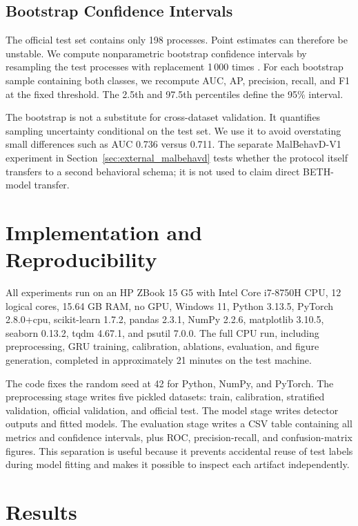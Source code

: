 \documentclass[10pt,journal,compsoc]{IEEEtran}
\begin{document}
\subsection{Bootstrap Confidence Intervals}

The official test set contains only 198 processes. Point estimates can therefore be unstable. We compute nonparametric bootstrap confidence intervals by resampling the test processes with replacement 1\,000 times \cite{efron1994}. For each bootstrap sample containing both classes, we recompute AUC, AP, precision, recall, and F1 at the fixed threshold. The 2.5th and 97.5th percentiles define the 95\% interval.

The bootstrap is not a substitute for cross-dataset validation. It quantifies sampling uncertainty conditional on the test set. We use it to avoid overstating small differences such as AUC 0.736 versus 0.711. The separate MalBehavD-V1 experiment in Section~\ref{sec:external_malbehavd} tests whether the protocol itself transfers to a second behavioral schema; it is not used to claim direct BETH-model transfer.

\section{Implementation and Reproducibility}
\label{sec:implementation}

All experiments run on an HP ZBook 15 G5 with Intel Core i7-8750H CPU, 12 logical cores, 15.64 GB RAM, no GPU, Windows 11, Python 3.13.5, PyTorch 2.8.0+cpu, scikit-learn 1.7.2, pandas 2.3.1, NumPy 2.2.6, matplotlib 3.10.5, seaborn 0.13.2, tqdm 4.67.1, and psutil 7.0.0. The full CPU run, including preprocessing, GRU training, calibration, ablations, evaluation, and figure generation, completed in approximately 21 minutes on the test machine.

The code fixes the random seed at 42 for Python, NumPy, and PyTorch. The preprocessing stage writes five pickled datasets: train, calibration, stratified validation, official validation, and official test. The model stage writes detector outputs and fitted models. The evaluation stage writes a CSV table containing all metrics and confidence intervals, plus ROC, precision-recall, and confusion-matrix figures. This separation is useful because it prevents accidental reuse of test labels during model fitting and makes it possible to inspect each artifact independently.

\section{Results}
\label{sec:results}
\end{document}
